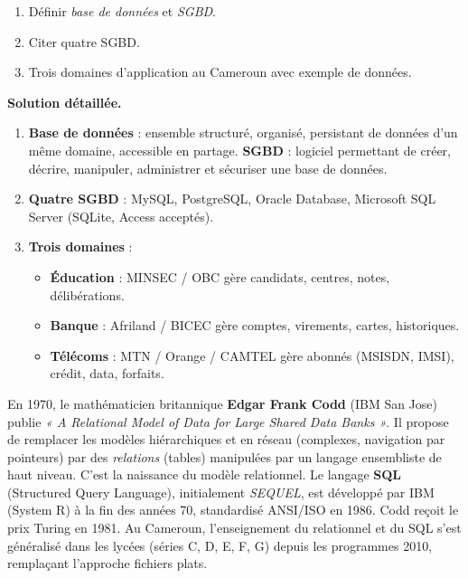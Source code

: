 \documentclass[11pt]{article}
\begin{document}
\begin{exoresolu}
\begin{enumerate}
\item Définir \emph{base de données} et \emph{SGBD}.
\item Citer quatre SGBD.
\item Trois domaines d'application au Cameroun avec exemple de données.
\end{enumerate}
\tcblower
\textbf{Solution détaillée.}
\begin{enumerate}
\item \textbf{Base de données} : ensemble structuré, organisé, persistant de données d'un même domaine, accessible en partage. \textbf{SGBD} : logiciel permettant de créer, décrire, manipuler, administrer et sécuriser une base de données.
\item \textbf{Quatre SGBD} : MySQL, PostgreSQL, Oracle Database, Microsoft SQL Server (SQLite, Access acceptés).
\item \textbf{Trois domaines} :
\begin{itemize}
\item \textbf{Éducation} : MINSEC / OBC gère candidats, centres, notes, délibérations.
\item \textbf{Banque} : Afriland / BICEC gère comptes, virements, cartes, historiques.
\item \textbf{Télécoms} : MTN / Orange / CAMTEL gère abonnés (MSISDN, IMSI), crédit, data, forfaits.
\end{itemize}
\end{enumerate}
\end{exoresolu}

\begin{savaistu}
En 1970, le mathématicien britannique \textbf{Edgar Frank Codd} (IBM San Jose) publie \emph{« A Relational Model of Data for Large Shared Data Banks »}. Il propose de remplacer les modèles hiérarchiques et en réseau (complexes, navigation par pointeurs) par des \emph{relations} (tables) manipulées par un langage ensembliste de haut niveau. C'est la naissance du modèle relationnel. Le langage \textbf{SQL} (Structured Query Language), initialement \emph{SEQUEL}, est développé par IBM (System R) à la fin des années 70, standardisé ANSI/ISO en 1986. Codd reçoit le prix Turing en 1981. Au Cameroun, l'enseignement du relationnel et du SQL s'est généralisé dans les lycées (séries C, D, E, F, G) depuis les programmes 2010, remplaçant l'approche fichiers plats.
\end{savaistu}
\end{document}
